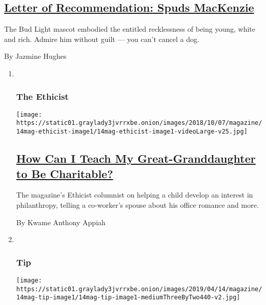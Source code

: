 \begin{enumerate}
{  \subsection{\texorpdfstring{\href{/2019/04/09/magazine/letter-of-recommendation-spuds-mackenzie.html}{Letter
  of Recommendation: Spuds
  MacKenzie}}{Letter of Recommendation: Spuds MacKenzie}}\label{letter-of-recommendation-spuds-mackenzie}}

  The Bud Light mascot embodied the entitled recklessness of being
  young, white and rich. Admire him without guilt --- you can't cancel a
  dog.

  By Jazmine Hughes
\end{enumerate}

\begin{enumerate}
\def\labelenumi{\arabic{enumi}.}
\item ~
  \hypertarget{the-ethicist}{%
  \subsubsection{The Ethicist}\label{the-ethicist}}

  \texttt{[image: https://static01.graylady3jvrrxbe.onion/images/2018/10/07/magazine/14mag-ethicist-image1/14mag-ethicist-image1-videoLarge-v25.jpg]}

  \hypertarget{how-can-i-teach-my-great-granddaughter-to-be-charitable}{%
  \subsection{\texorpdfstring{\href{/2019/04/09/magazine/how-can-i-teach-my-great-granddaughter-to-be-charitable.html}{How
  Can I Teach My Great-Granddaughter to Be
  Charitable?}}{How Can I Teach My Great-Granddaughter to Be Charitable?}}\label{how-can-i-teach-my-great-granddaughter-to-be-charitable}}

  The magazine's Ethicist columnist on helping a child develop an
  interest in philanthropy, telling a co-worker's spouse about his
  office romance and more.

  By Kwame Anthony Appiah
\item ~
  \hypertarget{tip}{%
  \subsubsection{Tip}\label{tip}}

  \texttt{[image: https://static01.graylady3jvrrxbe.onion/images/2019/04/14/magazine/14mag-tip-image1/14mag-tip-image1-mediumThreeByTwo440-v2.jpg]}


\end{enumerate}
